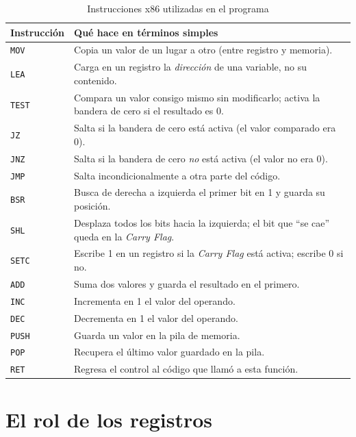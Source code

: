 \documentclass[12pt, letterpaper]{article}
\begin{document}
\begin{table}[H]
    \centering
    \begin{tabular}{@{}lp{9cm}@{}}
        \toprule
        \textbf{Instrucción} & \textbf{Qué hace en términos simples} \\
        \midrule
        \texttt{MOV}  & Copia un valor de un lugar a otro (entre registro y memoria). \\
        \texttt{LEA}  & Carga en un registro la \textit{dirección} de una variable, no su contenido. \\
        \texttt{TEST} & Compara un valor consigo mismo sin modificarlo; activa la bandera de cero si el resultado es 0. \\
        \texttt{JZ}   & Salta si la bandera de cero está activa (el valor comparado era 0). \\
        \texttt{JNZ}  & Salta si la bandera de cero \textit{no} está activa (el valor no era 0). \\
        \texttt{JMP}  & Salta incondicionalmente a otra parte del código. \\
        \texttt{BSR}  & Busca de derecha a izquierda el primer bit en 1 y guarda su posición. \\
        \texttt{SHL}  & Desplaza todos los bits hacia la izquierda; el bit que ``se cae'' queda en la \textit{Carry Flag}. \\
        \texttt{SETC} & Escribe 1 en un registro si la \textit{Carry Flag} está activa; escribe 0 si no. \\
        \texttt{ADD}  & Suma dos valores y guarda el resultado en el primero. \\
        \texttt{INC}  & Incrementa en 1 el valor del operando. \\
        \texttt{DEC}  & Decrementa en 1 el valor del operando. \\
        \texttt{PUSH} & Guarda un valor en la pila de memoria. \\
        \texttt{POP}  & Recupera el último valor guardado en la pila. \\
        \texttt{RET}  & Regresa el control al código que llamó a esta función. \\
        \bottomrule
    \end{tabular}
    \caption{Instrucciones x86 utilizadas en el programa}
\end{table}

\section{El rol de los registros}
\end{document}
